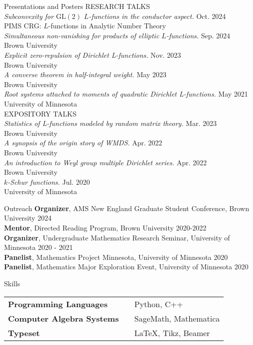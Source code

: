 \documentclass{resume} %
\begin{document}
\begin{rSection}{Presentations and Posters}
    RESEARCH TALKS \\
    {\em Subconvexity for $\mathrm{GL}(2)$ $L$-functions in the conductor aspect.} \hfill {Oct. 2024} \\
    \hphantom{\quad}PIMS CRG: $L$-functions in Analytic Number Theory \\
    {\em Simultaneous non-vanishing for products of elliptic $L$-functions.} \hfill {Sep. 2024} \\
    \hphantom{\quad}Brown University \\
    {\em Explicit zero-repulsion of Dirichlet L-functions.} \hfill {Nov. 2023} \\
    \hphantom{\quad}Brown University \\
    {\em A converse theorem in half-integral weight.} \hfill {May 2023} \\
    \hphantom{\quad}Brown University \\
    {\em Root systems attached to moments of quadratic Dirichlet L-functions.} \hfill {May 2021} \\
    \hphantom{\quad}University of Minnesota \\

    EXPOSITORY TALKS \\
    {\em Statistics of L-functions modeled by random matrix theory.} \hfill {Mar. 2023} \\ 
    \hphantom{\quad}Brown University \\
    {\em A synopsis of the origin story of WMDS.} \hfill {Apr. 2022} \\
    \hphantom{\quad}Brown University \\
    {\em An introduction to Weyl group multiple Dirichlet series.} \hfill {Apr. 2022} \\
    \hphantom{\quad}Brown University \\
    {\em $k$-Schur functions.} \hfill {Jul. 2020} \\ 
    \hphantom{\quad}University of Minnesota \\
\end{rSection}

\begin{rSection}{Outreach}
    {\bf Organizer}, AMS New England Graduate Student Conference, Brown University \hfill {2024} \\
    {\bf Mentor}, Directed Reading Program, Brown University \hfill {2020-2022} \\
    {\bf Organizer}, Undergraduate Mathematics Research Seminar, University of Minnesota \hfill {2020 - 2021} \\
    {\bf Panelist}, Mathematics Project Minnesota, University of Minnesota \hfill {2020} \\
    {\bf Panelist}, Mathematics Major Exploration Event, University of Minnesota \hfill {2020}
\end{rSection}

\begin{rSection}{Skills}
    \begin{tabular}{ @{} >{\bfseries}l @{\hspace{6ex}} l }
        Programming Languages \ & Python, C++ \\
        Computer Algebra Systems \ & SageMath, Mathematica \\
        Typeset \ & LaTeX, Tikz, Beamer \\
    \end{tabular}
\end{rSection}
\end{document}
